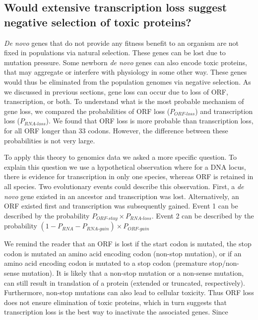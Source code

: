 \documentclass[12pt,a4paper]{article}
\begin{document}
\subsection{Would extensive transcription loss suggest negative selection of toxic proteins?}

\textit{De novo} genes that do not provide any fitness benefit to an organism are not fixed in populations via natural selection. These genes can be lost due to mutation pressure. Some newborn \textit{de novo} genes can also encode toxic proteins, that may aggregate or interfere with physiology in some other way. These genes would thus be eliminated from the population genomes via negative selection. As we discussed in previous sections, gene loss can occur due to loss of ORF, transcription, or both. To understand what is the most probable mechanism of gene loss, we compared the probabilities of ORF loss ($P_\textit{ORF-loss}$) and transcription loss ($P_\textit{RNA-loss}$). We found that ORF loss is more probable than transcription loss, for all ORF longer than 33 codons. However, the difference between these probabilities is not very large.

To apply this theory to genomics data we asked a more specific question. To explain this question we use a hypothetical observation where for a DNA locus, there is evidence for transcription in only one species, whereas ORF is retained in all species. Two evolutionary events could describe this observation. First, a \textit{de novo} gene existed in an ancestor and transcription was lost. Alternatively, an ORF existed first and transcription was subsequently gained. Event 1 can be described by the probability $P_\textit{ORF-stay}\times P_\textit{RNA-loss}$. Event 2 can be described by the probability $(1-P_\textit{RNA} - P_\textit{RNA-gain})\times P_\textit{ORF-gain}$



We remind the reader that an ORF is lost if the start codon is mutated, the stop codon is mutated an amino acid encoding codon (non-stop mutation), or if an amino acid encoding codon is mutated to a stop codon (premature stop/non-sense mutation). It is likely that a non-stop mutation or a non-sense mutation, can still result in translation of a protein (extended or truncated, respectively). Furthermore, non-stop mutations can also lead to cellular toxicity. Thus ORF loss does not ensure elimination of toxic proteins, which in turn suggests that transcription loss is the best way to inactivate the associated genes. Since 
\end{document}
